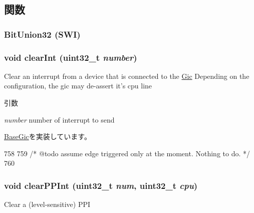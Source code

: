 \subsection{関数}
\hypertarget{classPl390_aa9b0863223c08e95ba11ad9fce05f3fe}{
\subsubsection[{BitUnion32}]{\setlength{\rightskip}{0pt plus 5cm}BitUnion32 (SWI)}}
\label{classPl390_aa9b0863223c08e95ba11ad9fce05f3fe}
\hypertarget{classPl390_a43d165dfc36b3fd1a965f2dc34eb1eda}{
\subsubsection[{clearInt}]{\setlength{\rightskip}{0pt plus 5cm}void clearInt ({\bf uint32\_\-t} {\em number})}}
\label{classPl390_a43d165dfc36b3fd1a965f2dc34eb1eda}
Clear an interrupt from a device that is connected to the \hyperlink{namespaceGic}{Gic} Depending on the configuration, the gic may de-\/assert it's cpu line 
\begin{DoxyParams}{引数}
\item[{\em number}]number of interrupt to send \end{DoxyParams}


\hyperlink{classBaseGic_a969450946c91b2daf6aa8ab1a60aa8c2}{BaseGic}を実装しています。


\begin{DoxyCode}
758 {
759     /* @todo assume edge triggered only at the moment. Nothing to do. */
760 }
\end{DoxyCode}
\hypertarget{classPl390_a48c1db2ce97470c7d34ee199564c2929}{
\subsubsection[{clearPPInt}]{\setlength{\rightskip}{0pt plus 5cm}void clearPPInt ({\bf uint32\_\-t} {\em num}, \/  {\bf uint32\_\-t} {\em cpu})}}
\label{classPl390_a48c1db2ce97470c7d34ee199564c2929}
Clear a (level-\/sensitive) PPI 

